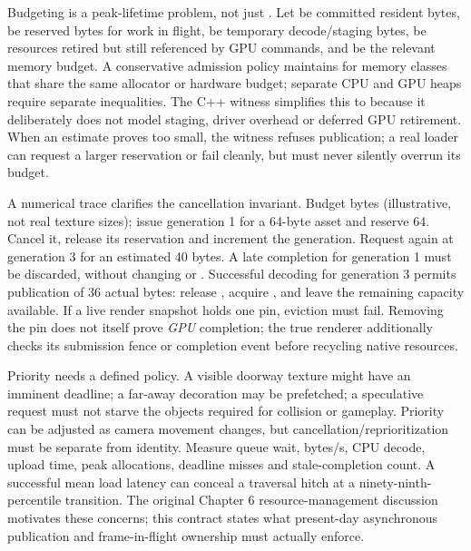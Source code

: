 Budgeting is a peak-lifetime problem, not just . Let  be committed resident bytes,  be reserved bytes for work in flight,  be temporary decode/staging bytes,  be resources retired but still referenced by GPU commands, and  be the relevant memory budget. A conservative admission policy maintains  for memory classes that share the same allocator or hardware budget; separate CPU and GPU heaps require separate inequalities. The C++ witness simplifies this to  because it deliberately does not model staging, driver overhead or deferred GPU retirement. When an estimate proves too small, the witness refuses publication; a real loader can request a larger reservation or fail cleanly, but must never silently overrun its budget.

A numerical trace clarifies the cancellation invariant. Budget  bytes (illustrative, not real texture sizes); issue generation 1 for a 64-byte asset and reserve 64. Cancel it, release its reservation and increment the generation. Request again at generation 3 for an estimated 40 bytes. A late completion for generation 1 must be discarded, without changing  or . Successful decoding for generation 3 permits publication of 36 actual bytes: release , acquire , and leave the remaining capacity available. If a live render snapshot holds one pin, eviction must fail. Removing the pin does not itself prove \emph{GPU} completion; the true renderer additionally checks its submission fence or completion event before recycling native resources.

Priority needs a defined policy. A visible doorway texture might have an imminent deadline; a far-away decoration may be prefetched; a speculative request must not starve the objects required for collision or gameplay. Priority can be adjusted as camera movement changes, but cancellation/reprioritization must be separate from identity. Measure queue wait, bytes/s, CPU decode, upload time, peak allocations, deadline misses and stale-completion count. A successful mean load latency can conceal a traversal hitch at a ninety-ninth-percentile transition. The original Chapter 6 resource-management discussion motivates these concerns; this contract states what present-day asynchronous publication and frame-in-flight ownership must actually enforce.

